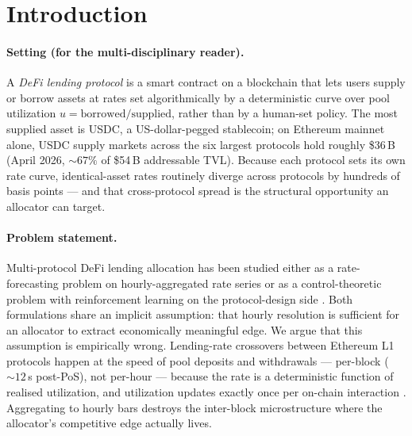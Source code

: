 \section{Introduction}
\label{sec:introduction}

\paragraph{Setting (for the multi-disciplinary reader).}  A
\emph{DeFi lending protocol} is a smart contract on a blockchain
that lets users supply or borrow assets at rates set algorithmically
by a deterministic curve over pool utilization $u = \text{borrowed}
/ \text{supplied}$, rather than by a human-set policy.  The most
supplied asset is USDC, a US-dollar-pegged stablecoin; on Ethereum
mainnet alone, USDC supply markets across the six largest protocols
hold roughly \$36\,B (April 2026, $\sim 67\%$ of \$54\,B addressable
TVL).  Because each protocol sets its own rate curve, identical-asset
rates routinely diverge across protocols by hundreds of basis points
--- and that cross-protocol spread is the structural opportunity an
allocator can target.

\paragraph{Problem statement.}  Multi-protocol DeFi lending
allocation has been studied either as a rate-forecasting problem on
hourly-aggregated rate series \cite{baude2025optimal} or as a
control-theoretic problem with reinforcement learning on the
protocol-design side \cite{bertucci2025rl, xu2023autogov,
agilerate2024}.  Both formulations share an implicit assumption: that
hourly resolution is sufficient for an allocator to extract
economically meaningful edge.  We argue that this assumption is
empirically wrong.  Lending-rate crossovers between Ethereum L1
protocols happen at the speed of pool deposits and withdrawals ---
per-block ($\sim 12$\,s post-PoS), not per-hour --- because the rate
is a deterministic function of realised utilization, and utilization
updates exactly once per on-chain interaction \cite{werner2022sok}.
Aggregating to hourly bars destroys the inter-block microstructure
where the allocator's competitive edge actually lives.

